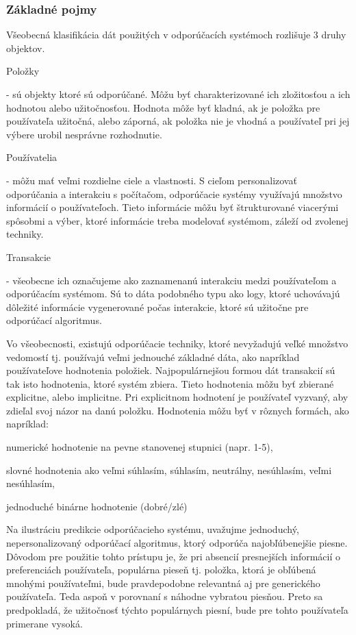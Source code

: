 \subsubsection{Základné pojmy}
Všeobecná klasifikácia dát použitých v odporúčacích systémoch rozlišuje 3 druhy objektov.
 \begin{itemize}[leftmargin=*]
{\bf \item Položky} - sú objekty ktoré sú odporúčané. Môžu byť charakterizované ich zložitosťou a ich hodnotou alebo užitočnosťou. Hodnota môže byť kladná, ak je položka pre používateľa užitočná, alebo záporná, ak položka nie je vhodná a používateľ pri jej výbere urobil nesprávne rozhodnutie.
{\bf \item Používatelia} - môžu mať veľmi rozdielne ciele a vlastnosti. S cieľom personalizovať odporúčania a interakciu s počítačom, odporúčacie systémy využívajú množstvo informácií o používateľoch. Tieto informácie môžu byť štrukturované viacerými spôsobmi a výber, ktoré informácie treba modelovať systémom, záleží od zvolenej techniky. 
{\bf \item Transakcie} - všeobecne ich označujeme ako zaznamenanú interakciu medzi používateľom a odporúčacím systémom. Sú to dáta podobného typu ako logy, ktoré uchovávajú dôležité informácie vygenerované počas interakcie, ktoré sú užitočne pre odporúčací algoritmus.
\end{itemize} 


Vo všeobecnosti, existujú odporúčacie techniky, ktoré nevyžadujú veľké množstvo vedomostí tj. používajú veľmi jednouché základné dáta, ako napríklad používateľove hodnotenia položiek. Najpopulárnejšou formou dát transakcií sú tak isto hodnotenia, ktoré systém zbiera. Tieto hodnotenia môžu byť zbierané explicitne, alebo implicitne. Pri explicitnom hodnotení je používateľ vyzvaný, aby zdieľal svoj názor na danú položku. Hodnotenia môžu byť v rôznych formách, ako napríklad:
 \begin{itemize}[leftmargin=*]
{\item numerické hodnotenie na pevne stanovenej stupnici (napr. 1-5),}
{\item slovné hodnotenia ako veľmi súhlasím, súhlasím, neutrálny, nesúhlasím, veľmi nesúhlasím,}
{\item jednoduché binárne hodnotenie (dobré/zlé)}
\end{itemize} 

 
Na ilustráciu predikcie odporúčacieho systému, uvažujme jednoduchý, nepersonalizovaný odporúčací algoritmus, ktorý odporúča najobľúbenejšie piesne. Dôvodom pre použitie tohto prístupu je, že pri absencií presnejších informácií o preferenciách používateľa, populárna pieseň tj. položka, ktorá je obľúbená mnohými používateľmi, bude pravdepodobne relevantná aj pre generického používateľa. Teda aspoň v porovnaní s náhodne vybratou piesňou. Preto sa predpokladá, že užitočnosť týchto populárnych piesní, bude pre tohto používateľa primerane vysoká.


